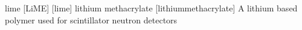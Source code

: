 \newglsXchemical%
{lime}%
[LiME]%
[lime]%
{lithium methacrylate}%
{}%
[lithiummethacrylate]%
{A lithium based polymer used for scintillator neutron detectors}%